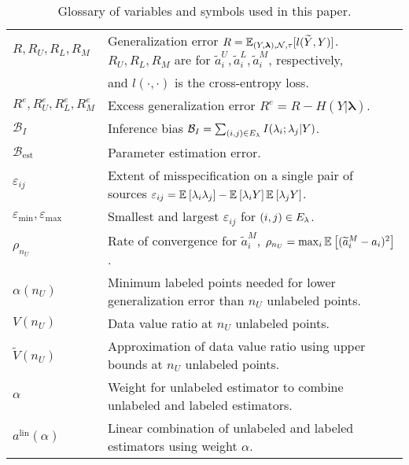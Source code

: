 \begin{table*}[h]
\begin{tabular}{l l}
$R,R_U,R_L,R_M$ & Generalization error $R = \mathbb{E}_{(Y, \bm{\lambda}), \mathcal{N}, \tau}[l(\widetilde{Y}, Y)]$. $R_U,R_L,R_M$ are for $\widetilde{a}_i^U,\widetilde{a}_i^L,\widetilde{a}_i^M$, respectively, \\
& and $l(\cdot, \cdot)$ is the cross-entropy loss.\\
$R^e,R^e_U,R^e_L,R^e_M$ & Excess generalization error $R^e=R-H(Y|\bm{\lambda})$.\\
$\mathcal{B}_I$ & Inference bias $\mathcal{B}_I=\sum_{(i, j) \in E_\lambda}I(\lambda_i; \lambda_j | Y)$.\\
$\mathcal{B}_\text{est}$ & Parameter estimation error.\\
$\varepsilon_{ij}$ & Extent of misspecification on a single pair of sources $\varepsilon_{ij} = \mathbb{E}_{}\left[\lambda_i \lambda_j\right] - \mathbb{E}_{}\left[\lambda_i Y\right] \mathbb{E}_{}\left[\lambda_j Y\right]$.\\
$\varepsilon_{\min},\varepsilon_{\max}$ & Smallest and largest $\varepsilon_{ij}$ for $(i,j)\in E_\lambda$.\\
$\rho_{n_U}$ & Rate of convergence for $\tilde{a}_i^M$, $\rho_{n_U} = \max_i \mathbb{E}_{}\left[(\widetilde{a}_i^M - a_i)^2\right]$.\\
$\alpha(n_U)$ & Minimum labeled points needed for lower generalization error than $n_U$ unlabeled points.\\
$V(n_U)$ & Data value ratio at $n_U$ unlabeled points.\\
$\widetilde{V}(n_U)$ & Approximation of data value ratio using upper bounds at $n_U$ unlabeled points.\\
$\alpha$ & Weight for unlabeled estimator to combine unlabeled and labeled estimators.\\
$a^{\text{lin}}(\alpha)$ & Linear combination of unlabeled and labeled estimators using weight $\alpha$.\\
\toprule
\end{tabular}
\caption{
	Glossary of variables and symbols used in this paper.
}
\label{table:glossary}
\end{table*}


\vfill

